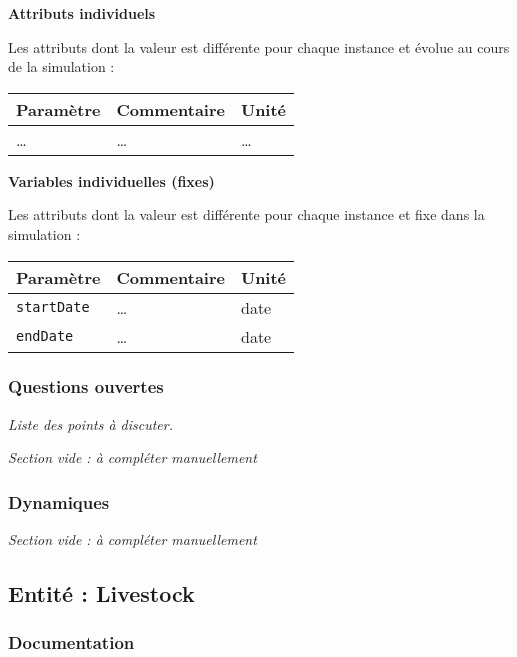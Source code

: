 \documentclass[
]{article}
\begin{document}
\textbf{Attributs individuels}

Les attributs dont la valeur est différente pour chaque instance et
évolue au cours de la simulation :

\begin{longtable}[]{@{}lll@{}}
\toprule\noalign{}
\textbf{Paramètre} & \textbf{Commentaire} & \textbf{Unité} \\
\midrule\noalign{}
\endhead
\bottomrule\noalign{}
\endlastfoot
\ldots{} & \ldots{} & \ldots{} \\
\end{longtable}

\textbf{Variables individuelles (fixes)}

Les attributs dont la valeur est différente pour chaque instance et fixe
dans la simulation :

\begin{longtable}[]{@{}lll@{}}
\toprule\noalign{}
\textbf{Paramètre} & \textbf{Commentaire} & \textbf{Unité} \\
\midrule\noalign{}
\endhead
\bottomrule\noalign{}
\endlastfoot
\texttt{startDate} & \ldots{} & date \\
\texttt{endDate} & \ldots{} & date \\
\end{longtable}

\subsubsection{Questions ouvertes}\label{questions-ouvertes-3}

\emph{Liste des points à discuter.}

\emph{Section vide : à compléter manuellement}

\subsubsection{Dynamiques}\label{dynamiques-3}

\emph{Section vide : à compléter manuellement}

\subsection{Entité : Livestock}\label{entituxe9-livestock}

\subsubsection{Documentation}\label{documentation-5}
\end{document}

